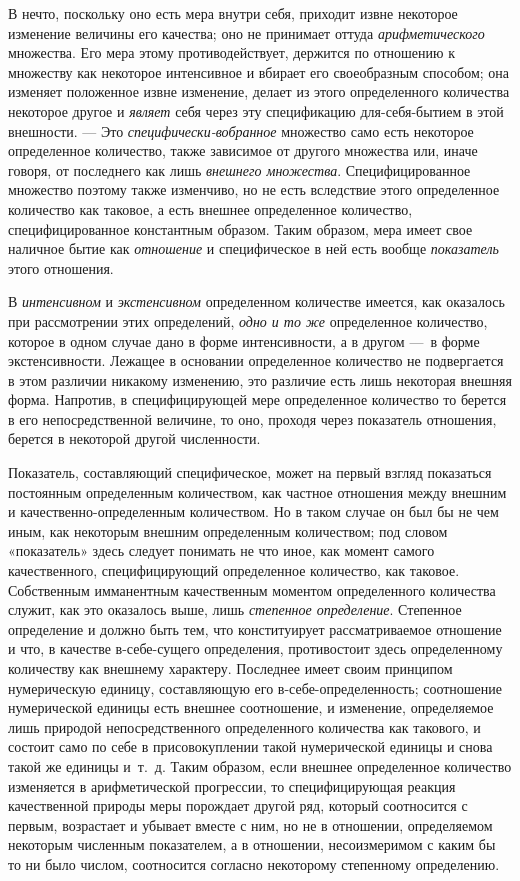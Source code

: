 В нечто, поскольку оно есть мера внутри себя, приходит извне некоторое
изменение величины его качества; оно не принимает оттуда
{\em арифметического} множества. Его мера этому
противодействует, держится по отношению к множеству как некоторое
интенсивное и вбирает его своеобразным способом; она изменяет положенное
извне изменение, делает из этого определенного количества некоторое другое
и {\em являет} себя через эту спецификацию
для-себя-бытием в этой внешности. — Это
{\em специфически-вобранное} множество само есть
некоторое определенное количество, также зависимое от другого множества
или, иначе говоря, от последнего как лишь {\em внешнего
множества}. Специфицированное множество поэтому также изменчиво, но не есть
вследствие этого определенное количество как таковое, а есть внешнее
определенное количество, специфицированное константным образом. Таким
образом, мера имеет свое наличное бытие как
{\em отношение} и специфическое в ней есть вообще
{\em показатель} этого отношения.

В {\em интенсивном} и
{\em экстенсивном} определенном количестве имеется, как
оказалось при рассмотрении этих определений, {\em одно
и то же} определенное количество, которое в одном случае дано в форме
интенсивности, а в другом —~в форме экстенсивности. Лежащее в основании
определенное количество не подвергается в этом различии никакому изменению,
это различие есть лишь некоторая внешняя форма. Напротив, в специфицирующей
мере определенное количество то берется в его непосредственной величине, то
оно, проходя через показатель отношения, берется в некоторой другой
численности.

Показатель, составляющий специфическое, может на первый взгляд показаться
постоянным определенным количеством, как частное отношения между внешним и
качественно-определенным количеством. Но в таком случае он был бы не чем
иным, как некоторым внешним определенным количеством; под словом
«показатель» здесь следует понимать не что иное, как момент самого
качественного, специфицирующий определенное количество, как таковое.
Собственным имманентным качественным моментом определенного количества
служит, как это оказалось выше, лишь {\em степенное
определение}. Степенное определение и должно быть тем, что конституирует
рассматриваемое отношение и что, в качестве в-себе-сущего определения,
противостоит здесь определенному количеству как внешнему характеру.
Последнее имеет своим принципом нумерическую единицу, составляющую его
в-себе-определенность; соотношение нумерической единицы есть внешнее
соотношение, и изменение, определяемое лишь природой непосредственного
определенного количества как такового, и состоит само по себе в
присовокуплении такой нумерической единицы и снова такой же единицы и~т.~д.
Таким образом, если внешнее определенное количество изменяется в
арифметической прогрессии, то специфицирующая реакция качественной природы
меры порождает другой ряд, который соотносится с первым, возрастает и
убывает вместе с ним, но не в отношении, определяемом некоторым численным
показателем, а в отношении, несоизмеримом с каким бы то ни было числом,
соотносится согласно некоторому степенному определению.

